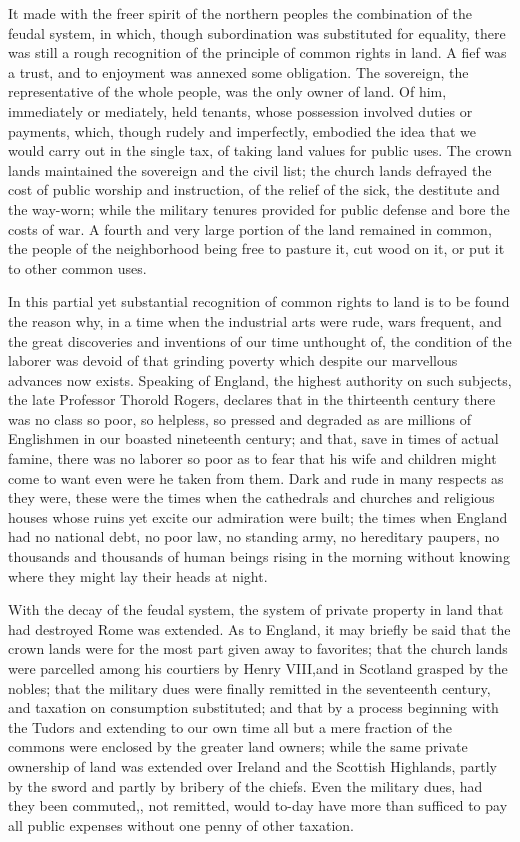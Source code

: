 \documentclass{book}
\begin{document}
It made with the freer spirit of the northern peoples the combination of the feudal system, in which, though subordination was substituted for equality, there was still a rough recognition of the principle of common rights in land. A fief was a trust, and to enjoyment was annexed some obligation. The sovereign, the representative of the whole people, was the only owner of land. Of him, immediately or mediately, held tenants, whose possession involved duties or payments, which, though rudely and imperfectly, embodied the idea that we would carry out in the single tax, of taking land values for public uses. The crown lands maintained the sovereign and the civil list; the church lands defrayed the cost of public worship and instruction, of the relief of the sick, the destitute and the way-worn; while the military tenures provided for public defense and bore the costs of war. A fourth and very large portion of the land remained in common, the people of the neighborhood being free to pasture it, cut wood on it, or put it to other common uses.

In this partial yet substantial recognition of common rights to land is to be found the reason why, in a time when the industrial arts were rude, wars frequent, and the great discoveries and inventions of our time unthought of, the condition of the laborer was devoid of that grinding poverty which despite our marvellous advances now exists. Speaking of England, the highest authority on such subjects, the late Professor Thorold Rogers, declares that in the thirteenth century there was no class so poor, so helpless, so pressed and degraded as are millions of Englishmen in our boasted nineteenth century; and that, save in times of actual famine, there was no laborer so poor as to fear that his wife and children might come to want even were he taken from them. Dark and rude in many respects as they were, these were the times when the cathedrals and churches and religious houses whose ruins yet excite our admiration were built; the times when England had no national debt, no poor law, no standing army, no hereditary paupers, no thousands and thousands of human beings rising in the morning without knowing where they might lay their heads at night.

With the decay of the feudal system, the system of private property in land that had destroyed Rome was extended. As to England, it may briefly be said that the crown lands were for the most part given away to favorites; that the church lands were parcelled among his courtiers by Henry VIII,and in Scotland grasped by the nobles; that the military dues were finally remitted in the seventeenth century, and taxation on consumption substituted; and that by a process beginning with the Tudors and extending to our own time all but a mere fraction of the commons were enclosed by the greater land owners; while the same private ownership of land was extended over Ireland and the Scottish Highlands, partly by the sword and partly by bribery of the chiefs. Even the military dues, had they been commuted,, not remitted, would to-day have more than sufficed to pay all public expenses without one penny of other taxation.
\end{document}
